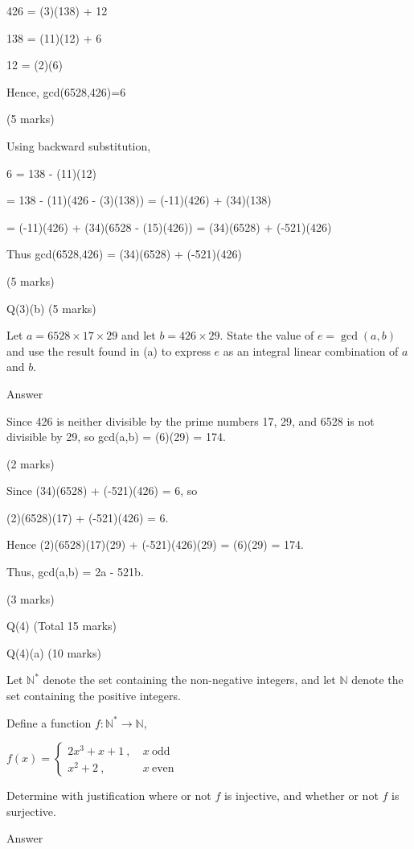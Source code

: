 \documentclass[a4paper,12pt,oneside]{book}
\theoremstyle{definition}
\begin{document}
426 = (3)(138) + 12

138 = (11)(12) + 6 

12 = (2)(6)

Hence, gcd(6528,426)=6

(5 marks)  

Using backward substitution,

6 = 138 - (11)(12)

= 138 - (11)(426 - (3)(138)) = (-11)(426) + (34)(138)

= (-11)(426) + (34)(6528 - (15)(426)) = (34)(6528) + (-521)(426)

Thus gcd(6528,426) =  (34)(6528) + (-521)(426)

(5 marks)  

Q(3)(b) (5 marks)

Let $a = 6528 \times 17 \times 29$ and let $b = 426 \times 29$. State the value of $e=\gcd(a,b)$ and use the result found in (a) to express $e$ as an integral linear combination of $a$ and $b$.

Answer

Since 426 is neither divisible by the prime numbers 17, 29, and 6528 is not divisible by 29, so gcd(a,b) = (6)(29) = 174.

(2 marks)

Since (34)(6528) + (-521)(426) = 6, so

(2)(6528)(17) + (-521)(426) = 6.

Hence (2)(6528)(17)(29) + (-521)(426)(29) = (6)(29) = 174.

Thus, gcd(a,b) = 2a - 521b.

(3 marks)

\newpage

Q(4) (Total 15 marks)

Q(4)(a) (10 marks)

Let $\mathbb{N}^*$ denote the set containing the non-negative integers, and let $\mathbb{N}$ denote the set containing the positive integers.

Define a function $f : \mathbb{N}^* \rightarrow \mathbb{N}$,

$f(x) = \begin{cases} 2x^3 + x + 1 \ , & \ x \ \text{odd} \\ x^2 + 2 \ , & \ x \ \text{even} \end{cases}$

Determine with justification where or not $f$ is injective, and whether or not $f$ is surjective.

Answer
\end{document}
